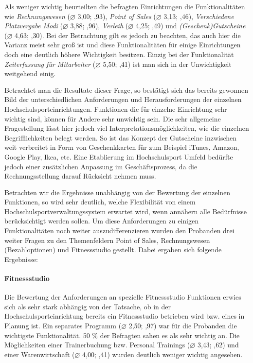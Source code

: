 Als weniger wichtig beurteilten die befragten Einrichtungen die Funktionalitäten wie \textit{Rechnungswesen} ($\varnothing$ 3,00; ,93), \textit{Point of Sales} ($\varnothing$ 3,13; ,46), \textit{Verschiedene Platzvergabe Modi} ($\varnothing$ 3,88; ,96), \textit{Verleih} ($\varnothing$ 4,25; ,49) und \textit{(Geschenk)Gutscheine} ($\varnothing$ 4,63; ,30). Bei der Betrachtung gilt es jedoch zu beachten, das auch hier die Varianz meist sehr groß ist und diese Funktionalitäten für einige Einrichtungen doch eine deutlich höhere Wichtigkeit besitzen.
Einzig bei der Funktionalität \textit{Zeiterfassung für Mitarbeiter} ($\varnothing$ 5,50; ,41) ist man sich in der Unwichtigkeit weitgehend einig.

Betrachtet man die Resultate dieser Frage, so bestätigt sich das bereits gewonnen Bild der unterschiedlichen Anforderungen und Herausforderungen der einzelnen Hochschulsporteinrichtungen. Funktionen die für einzelne Einrichtung sehr wichtig sind, können für Andere sehr unwichtig sein. Die sehr allgemeine Fragestellung lässt hier jedoch viel Interpretationsmöglichkeiten, wie die einzelnen Begrifflichkeiten belegt werden. So ist das Konzept der Gutscheine inzwischen weit verbreitet in Form von Geschenkkarten für zum Beispiel iTunes, Amazon, Google Play, Ikea, etc. Eine Etablierung im Hochschulsport Umfeld bedürfte jedoch einer zusätzlichen Anpassung im Geschäftsprozess, da die Rechnungsstellung darauf Rücksicht nehmen muss.

Betrachten wir die Ergebnisse unabhängig von der Bewertung der einzelnen Funktionen, so wird sehr deutlich, welche Flexibilität von einem Hochschulsportverwaltungssystem erwartet wird, wenn annähern alle Bedürfnisse berücksichtigt werden sollen. Um diese Anforderungen zu einigen Funktionalitäten noch weiter auszudifferenzieren wurden den Probanden drei weiter Fragen zu den Themenfeldern Point of Sales, Rechnungswesen (Bezahloptionen) und Fitnessstudio gestellt. Dabei ergaben sich folgende Ergebnisse:

\paragraph*{Fitnessstudio}
Die Bewertung der Anforderungen an spezielle Fitnessstudio Funktionen erwies sich als sehr stark abhängig von der Tatsache, ob in der Hochschulsporteinrichtung bereits ein Fitnessstudio betrieben wird bzw. eines in Planung ist. Ein separates Programm ($\varnothing$ 2,50; ,97) war für die Probanden die wichtigste Funktionalität. 50 \% der Befragten sahen es als sehr wichtig an. Die Möglichkeiten einer Trainerbuchung bzw. Personal Trainings ($\varnothing$ 3,43; ,62) und einer Warenwirtschaft ($\varnothing$ 4,00; ,41) wurden deutlich weniger wichtig angesehen. 

